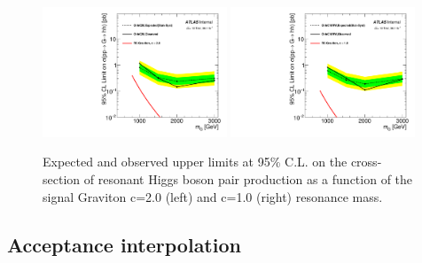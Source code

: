 \begin{figure}[!h]
\begin{center}
\includegraphics*[width=0.49\textwidth]{./figures/boosted/LimitsUnblinded/Limits_RebinWSMaker_Baseline_ForNote_UNBLINDED_7000XXXX_GravitonC20}
\includegraphics*[width=0.49\textwidth]{./figures/boosted/LimitsUnblinded/Limits_RebinWSMaker_Baseline_ForNote_UNBLINDED_7000XXXX_GravitonC10RW}
\caption{Expected and observed upper limits at 95\% C.L. on the cross-section of resonant Higgs boson pair production
as a function of the signal Graviton c=2.0 (left) and c=1.0 (right) resonance mass.}
\label{fig:boosted_siginter_limit_obs_gravMC}
\end{center}
\end{figure}
\FloatBarrier

\subsection{Acceptance interpolation}
\label{app:boosted_siginter_acceptance}

